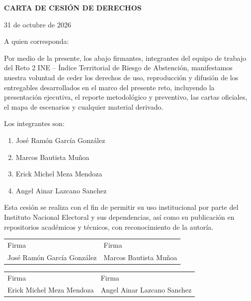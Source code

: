 \documentclass[12pt,a4paper]{article}
\begin{document}
\begin{center}
{\large \textbf{CARTA DE CESIÓN DE DERECHOS}}
\end{center}

\vspace{1cm}

31 de octubre de 2026

A quien corresponda:

Por medio de la presente, los abajo firmantes, integrantes del equipo de trabajo del Reto 2 INE -- Índice Territorial de Riesgo de Abstención, manifestamos nuestra voluntad de ceder los derechos de uso, reproducción y difusión de los entregables desarrollados en el marco del presente reto, incluyendo la presentación ejecutiva, el reporte metodológico y preventivo, las cartas oficiales, el mapa de escenarios y cualquier material derivado.

Los integrantes son:

\begin{enumerate}
\item José Ramón García González
\item Marcos Bautista Muñoa
\item Erick Michel Meza Mendoza
\item Angel Ainar Lazcano Sanchez
\end{enumerate}

Esta cesión se realiza con el fin de permitir su uso institucional por parte del Instituto Nacional Electoral y sus dependencias, así como su publicación en repositorios académicos y técnicos, con reconocimiento de la autoría.

\vspace{3cm}

\begin{center}
\begin{tabular}{p{6cm}p{6cm}}
\hline
Firma & Firma \\
José Ramón García González & Marcos Bautista Muñoa \\
\hline
\end{tabular}

\vspace{1cm}

\begin{tabular}{p{6cm}p{6cm}}
\hline
Firma & Firma \\
Erick Michel Meza Mendoza & Angel Ainar Lazcano Sanchez \\
\hline
\end{tabular}
\end{center}
\end{document}
